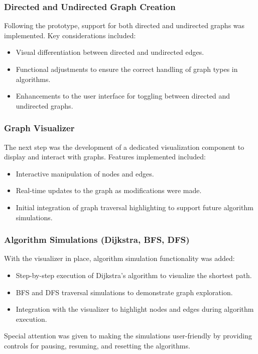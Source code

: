 \subsubsection{Directed and Undirected Graph Creation}
Following the prototype, support for both directed and undirected graphs was implemented. Key considerations included:
\begin{itemize}
    \item Visual differentiation between directed and undirected edges.
    \item Functional adjustments to ensure the correct handling of graph types in algorithms.
    \item Enhancements to the user interface for toggling between directed and undirected graphs.
\end{itemize}

\subsubsection{Graph Visualizer}
The next step was the development of a dedicated visualization component to display and interact with graphs. Features implemented included:
\begin{itemize}
    \item Interactive manipulation of nodes and edges.
    \item Real-time updates to the graph as modifications were made.
    \item Initial integration of graph traversal highlighting to support future algorithm simulations.
\end{itemize}

\subsubsection{Algorithm Simulations (Dijkstra, BFS, DFS)}
With the visualizer in place, algorithm simulation functionality was added:
\begin{itemize}
    \item Step-by-step execution of Dijkstra’s algorithm to visualize the shortest path.
    \item BFS and DFS traversal simulations to demonstrate graph exploration.
    \item Integration with the visualizer to highlight nodes and edges during algorithm execution.
\end{itemize}
Special attention was given to making the simulations user-friendly by providing controls for pausing, resuming, and resetting the algorithms.

